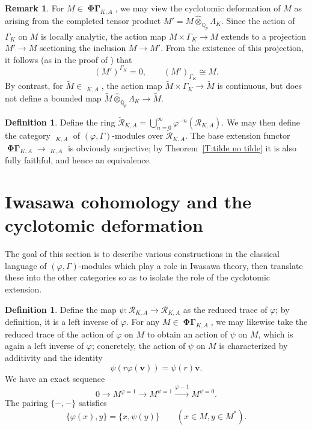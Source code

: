 \documentclass[12pt]{amsart}
\theoremstyle{definition}
\newtheorem{defn}[theorem]{Definition}
\newtheorem{remark}[theorem]{Remark}
\numberwithin{equation}{theorem}
\newcommand{\bv}{\mathbf{v}}
\newcommand{\Qp}{\mathbb{Q}_p}
\newcommand{\QQ}{\mathbb{Q}}
\newcommand{\calR}{\mathcal{R}}
\DeclareMathOperator{\PhiGamma}{\mathbf{\Phi \Gamma}}
\DeclareMathOperator{\PhiGammabreve}{\breve{\mathbf{\Phi \Gamma}}}
\DeclareMathOperator{\PhiGammatilde}{\widetilde{\mathbf{\Phi \Gamma}}}
\begin{document}
\begin{remark} \label{R:Gamma acyclic}
For $M \in \PhiGamma_{K,A}$, we may view the cyclotomic deformation of $M$ as arising from the completed tensor product $M' = M \widehat{\otimes}_{\Qp} \Lambda_K$. Since the action of $\Gamma_K$ on $M$ is locally analytic, the action map $M \times \Gamma_K \to M$ extends to a projection $M' \to M$ sectioning the inclusion $M \to M'$. From the existence of this projection, it follows (as in the proof of \cite[Theorem~4.4.8]{kpx}) that 
\[
(M')^{\Gamma_K} = 0, \qquad (M')_{\Gamma_K} \cong M.
\]
By contrast, for $\tilde{M} \in \PhiGammatilde_{K,A}$, the action map
$\tilde{M} \times \Gamma_K \to \tilde{M}$ is continuous, but does not define a bounded map
$\tilde{M} \widehat{\otimes}_{\QQ_p} \Lambda_K \to \tilde{M}$.
\end{remark}

\begin{defn}
Define the ring $\breve{\calR}_{K,A} = \bigcup_{n=0}^\infty \varphi^{-n}(\calR_{K,A})$.
We may then define the category $\PhiGammabreve_{K,A}$ of $(\varphi, \Gamma)$-modules over $\breve{\calR}_{K,A}$. The base extension functor $\PhiGamma_{K,A} \to \PhiGammabreve_{K,A}$ is obviously surjective; by Theorem~\ref{T:tilde no tilde} it is also fully faithful, and hence an equivalence.
\end{defn}

\section{Iwasawa cohomology and the cyclotomic deformation}

The goal of this section is to describe various constructions in the classical language of $(\varphi, \Gamma)$-modules which play a role in Iwasawa theory, then translate these into the other categories so as to isolate the role of the cyclotomic extension.

\begin{defn}
Define the map $\psi: \calR_{K,A} \to \calR_{K,A}$ as the reduced trace of $\varphi$; by definition, it is a left inverse of $\varphi$. For any $M \in \PhiGamma_{K,A}$,
we may likewise take the reduced trace of the action of $\varphi$ on $M$ to obtain an action of $\psi$ on $M$, which is again a left inverse of $\varphi$;
concretely, the action of $\psi$ on $M$ is characterized by additivity and the identity
\[
\psi(r \varphi(\bv)) = \psi(r) \bv.
\]
We have an exact sequence
\begin{equation} \label{eq:psi sequence}
0 \to M^{\varphi=1} \to M^{\psi=1} \stackrel{\varphi-1}{\longrightarrow} M^{\psi=0}.
\end{equation}
The pairing $\{-, - \}$ satisfies
\begin{equation} \label{eq:pairing phi psi}
\{\varphi(x), y\} = \{x, \psi(y)\} \qquad (x \in M, y \in M^*).
\end{equation}
\end{defn}
\end{document}
